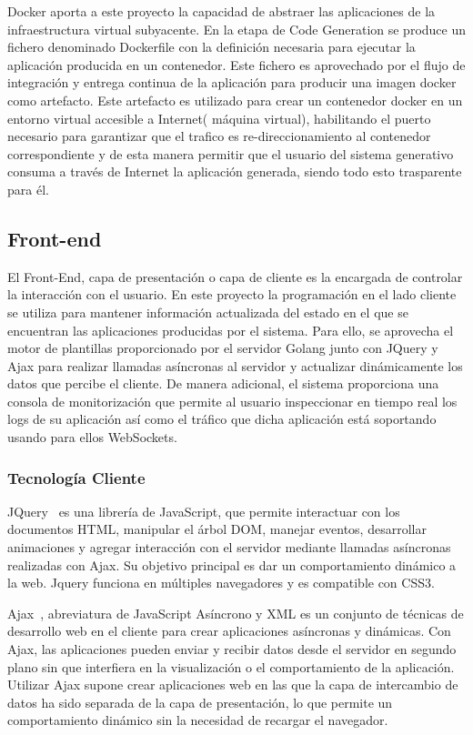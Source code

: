 \documentclass[a4paper,11pt]{book}
\begin{document}
Docker aporta a este proyecto la capacidad de abstraer las aplicaciones de la infraestructura virtual subyacente. En la etapa de Code Generation se produce un fichero denominado Dockerfile con la definición necesaria para ejecutar la aplicación producida en un contenedor. Este fichero es aprovechado  por el flujo de integración y entrega continua de la aplicación  para producir una imagen docker como artefacto. Este artefacto es utilizado para crear un contenedor docker en un entorno virtual accesible a Internet( máquina virtual), habilitando el puerto necesario para garantizar que el trafico es re-direccionamiento al contenedor correspondiente y de esta manera permitir que el usuario del sistema generativo consuma a través de Internet la aplicación generada, siendo todo esto trasparente para él. 


\subsection{Front-end}

El Front-End, capa de presentación o capa de cliente es la encargada de controlar la interacción con el usuario. En este proyecto la programación en el lado cliente se utiliza para mantener  información actualizada del estado en el que se encuentran las aplicaciones producidas por el sistema. Para ello, se aprovecha el motor de plantillas proporcionado por el servidor Golang junto con JQuery y Ajax para realizar llamadas asíncronas al servidor y actualizar dinámicamente los datos que percibe el cliente. De manera adicional, el sistema proporciona una consola de monitorización  que permite al usuario inspeccionar en tiempo real los logs de su aplicación así como el tráfico que dicha aplicación está soportando usando para ellos WebSockets. 

\subsubsection{Tecnología Cliente}


JQuery~\cite{jq} es una librería de JavaScript, que permite interactuar con los documentos HTML, manipular el árbol DOM, manejar eventos, desarrollar animaciones y agregar interacción con el servidor mediante llamadas asíncronas realizadas con Ajax. Su objetivo principal es dar un comportamiento dinámico a la web. Jquery funciona en múltiples navegadores y es compatible con CSS3.

Ajax~\cite{aj}, abreviatura de JavaScript Asíncrono y XML es un conjunto de técnicas de desarrollo web en el cliente para crear aplicaciones asíncronas y dinámicas. Con Ajax, las aplicaciones pueden enviar y recibir datos desde el servidor en segundo plano sin que interfiera en la visualización o el comportamiento de la aplicación. Utilizar Ajax supone crear aplicaciones web en las que la capa de intercambio de datos ha sido separada de la capa de presentación, lo que permite un comportamiento dinámico sin la necesidad de recargar el navegador.
\end{document}
